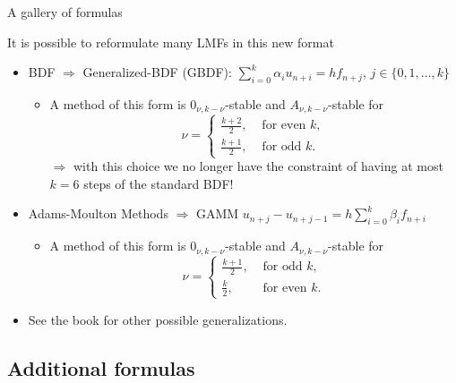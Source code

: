 \documentclass[aspectratio=169,xcolor=dvipsnames]{beamer}
\begin{document}
\begin{frame}{A gallery of formulas}

It is possible to reformulate many LMFs in this new format
\begin{itemize}
	\item[\faCog]<2-> BDF $\Rightarrow$ Generalized-BDF (GBDF): $\sum_{i=0}^{k} \alpha_i u_{n+i} = h f_{n+j}$, $j \in \{0,1,\ldots,k\}$
	 \begin{itemize}
	 	\item[\faExclamationCircle]<3-> \normalsize  A method of this form is $0_{\nu,k-\nu}$-stable and $A_{\nu,k-\nu}$-stable for
	 	\[
	 	\nu = \begin{cases}
	 		\frac{k+2}{2}, & \text{ for even }k,\\
	 		\frac{k+1}{2}, & \text{ for odd }k.
	 	\end{cases}
	 	\]
	 	$\Rightarrow$ with this choice we \alert{no longer have the constraint} of having at most $k=6$ steps of the standard BDF!
	 \end{itemize}
 	\item[\faCog]<3-> Adams-Moulton Methods $\Rightarrow$ GAMM $u_{n+j} - u_{n+j-1} = h \sum_{i=0}^{k} \beta_i f_{n+i}$
	 \begin{itemize}
 		\item[\faExclamationCircle]<4-> \normalsize  A method of this form is $0_{\nu,k-\nu}$-stable and $A_{\nu,k-\nu}$-stable for
 		\[
 		\nu = \begin{cases}
 			\frac{k+1}{2}, & \text{ for odd }k,\\
 			\frac{k}{2}, & \text{ for even }k.
 		\end{cases}
 		\]
 	\end{itemize}
 	\item[\faBook]<4-> See the book \parencite{MR1673796} for other possible generalizations.
\end{itemize}

\end{frame}

\subsection{Additional formulas}
\end{document}
